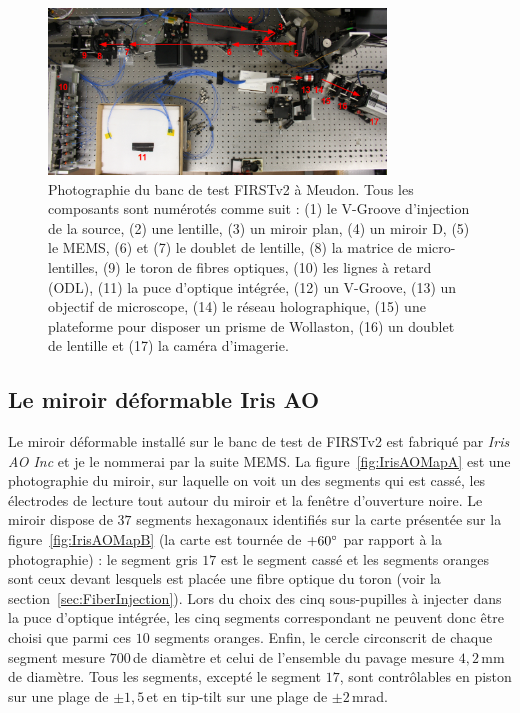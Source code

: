 \begin{figure}[ht!]
    \centering
    \includegraphics[width=0.8\textwidth]{Figure_Chap2/20211215_FIRSTv2_MeudonBench_03.png}
    \caption[Photographie du banc de test FIRSTv2 à Meudon.]{Photographie du banc de test FIRSTv2 à Meudon. Tous les composants sont numérotés comme suit : (1) le V-Groove d'injection de la source, (2) une lentille, (3) un miroir plan, (4) un miroir D, (5) le MEMS, (6) et (7) le doublet de lentille, (8) la matrice de micro-lentilles, (9) le toron de fibres optiques, (10) les lignes à retard (ODL), (11) la puce d'optique intégrée, (12) un V-Groove, (13) un objectif de microscope, (14) le réseau holographique, (15) une plateforme pour disposer un prisme de Wollaston, (16) un doublet de lentille et (17) la caméra d'imagerie.}
    \label{fig:FIRSTv2BenchPhoto}
\end{figure}


\subsection{Le miroir déformable Iris AO}

Le miroir déformable installé sur le banc de test de \ac{FIRSTv2} est fabriqué par \textit{Iris AO Inc} et je le nommerai par la suite \ac{MEMS}. La figure~\ref{fig:IrisAOMapA} est une photographie du miroir, sur laquelle on voit un des segments qui est cassé, les électrodes de lecture tout autour du miroir et la fenêtre d'ouverture noire. Le miroir dispose de $37$ segments hexagonaux identifiés sur la carte présentée sur la figure~\ref{fig:IrisAOMapB} (la carte est tournée de $+60^{\circ}$ par rapport à la photographie) : le segment gris $17$ est le segment cassé et les segments oranges sont ceux devant lesquels est placée une fibre optique du toron (voir la section~\ref{sec:FiberInjection}). Lors du choix des cinq sous-pupilles à injecter dans la puce d'optique intégrée, les cinq segments correspondant ne peuvent donc être choisi que parmi ces $10$ segments oranges. Enfin, le cercle circonscrit de chaque segment mesure $700 \,$\um de diamètre et celui de l'ensemble du pavage mesure $4,2 \,$mm de diamètre. Tous les segments, excepté le segment $17$, sont contrôlables en piston sur une plage de $\pm 1,5 \,$\um et en tip-tilt sur une plage de $\pm 2\,$mrad.

